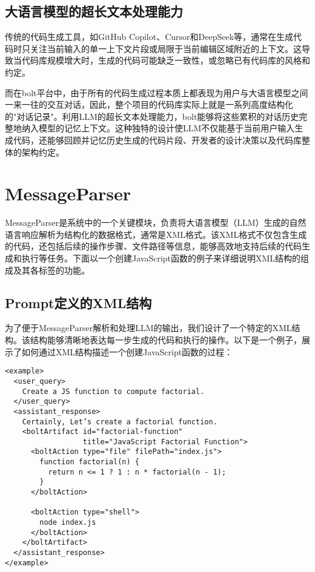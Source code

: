 \subsection{大语言模型的超长文本处理能力}

传统的代码生成工具，如GitHub Copilot、Cursor和DeepSeek等，通常在生成代码时只关注当前输入的单一上下文片段或局限于当前编辑区域附近的上下文。这导致当代码库规模增大时，生成的代码可能缺乏一致性，或忽略已有代码库的风格和约定。

而在bolt平台中，由于所有的代码生成过程本质上都表现为用户与大语言模型之间一来一往的交互对话，因此，整个项目的代码库实际上就是一系列高度结构化的"对话记录"。利用LLM的超长文本处理能力，bolt能够将这些累积的对话历史完整地纳入模型的记忆上下文。这种独特的设计使LLM不仅能基于当前用户输入生成代码，还能够回顾并记忆历史生成的代码片段、开发者的设计决策以及代码库整体的架构约定。

\section{MessageParser}

MessageParser是系统中的一个关键模块，负责将大语言模型（LLM）生成的自然语言响应解析为结构化的数据格式，通常是XML格式。该XML格式不仅包含生成的代码，还包括后续的操作步骤、文件路径等信息，能够高效地支持后续的代码生成和执行等任务。下面以一个创建JavaScript函数的例子来详细说明XML结构的组成及其各标签的功能。

\subsection{Prompt定义的XML结构}

为了便于MessageParser解析和处理LLM的输出，我们设计了一个特定的XML结构。该结构能够清晰地表达每一步生成的代码和执行的操作。以下是一个例子，展示了如何通过XML结构描述一个创建JavaScript函数的过程：

\begin{verbatim}
<example>
  <user_query>
    Create a JS function to compute factorial.
  </user_query>
  <assistant_response>
    Certainly, Let’s create a factorial function.
    <boltArtifact id="factorial-function" 
                  title="JavaScript Factorial Function">
      <boltAction type="file" filePath="index.js">
        function factorial(n) {
          return n <= 1 ? 1 : n * factorial(n - 1);
        }
      </boltAction>

      <boltAction type="shell">
        node index.js
      </boltAction>
    </boltArtifact>
  </assistant_response>
</example>
\end{verbatim}

